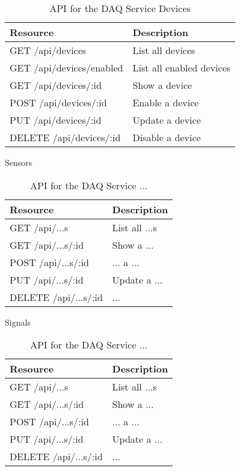       \begin{table}[H]
        \centering
        \begin{tabular}{p{6cm} p{10cm}}
          \toprule
          \textbf{Resource} & \textbf{Description} \\ [0.5ex]
          \midrule
          GET /api/devices & List all devices \\
          GET /api/devices/enabled & List all enabled devices \\
          GET /api/devices/:id & Show a device \\
          POST /api/devices/:id & Enable a device \\
          PUT /api/devices/:id & Update a device \\
          DELETE /api/devices/:id & Disable a device \\
          \bottomrule
        \end{tabular}
        \caption{API for the DAQ Service Devices}\label{tab:rest-daq-dev}
      \end{table}

      \large{Sensors}

      \begin{table}[H]
        \centering
        \begin{tabular}{p{6cm} p{10cm}}
          \toprule
          \textbf{Resource} & \textbf{Description} \\ [0.5ex]
          \midrule
          GET /api/...s & List all ...s \\
          GET /api/...s/:id & Show a ... \\
          POST /api/...s/:id & ... a ... \\
          PUT /api/...s/:id & Update a ... \\
          DELETE /api/...s/:id & ... \\
          \bottomrule
        \end{tabular}
        \caption{API for the DAQ Service ...}\label{tab:rest-daq-...}
      \end{table}

      \large{Signals}

      \begin{table}[H]
        \centering
        \begin{tabular}{p{6cm} p{10cm}}
          \toprule
          \textbf{Resource} & \textbf{Description} \\ [0.5ex]
          \midrule
          GET /api/...s & List all ...s \\
          GET /api/...s/:id & Show a ... \\
          POST /api/...s/:id & ... a ... \\
          PUT /api/...s/:id & Update a ... \\
          DELETE /api/...s/:id & ... \\
          \bottomrule
        \end{tabular}
        \caption{API for the DAQ Service ...}\label{tab:rest-daq-...}
      \end{table}

